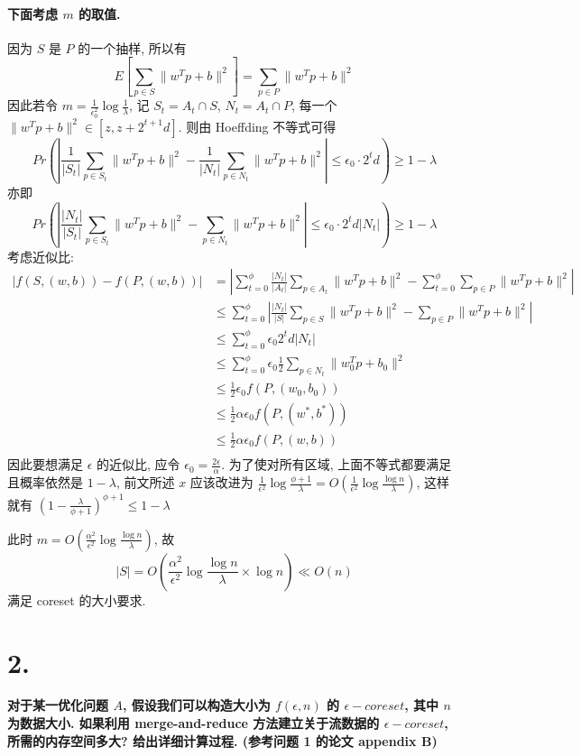 \documentclass[UTF8]{article}
\newcommand{\jumpLine} {\hspace*{\fill} \par}
\begin{document}
\paragraph{下面考虑 $m$ 的取值.} 因为 $S$ 是 $P$ 的一个抽样, 所以有 
$$E\left[\sum\limits_{p\in S} \|w^Tp + b\|^2\right] = \sum\limits_{p\in P} \|w^Tp + b\|^2$$
因此若令 $m=\frac{1}{\epsilon_0^2}\log\frac{1}{\lambda}$, 记 $S_t=A_t\cap S$, $N_t=A_t\cap P$, 每一个 $\|w^Tp + b\|^2 \in [z,z+2^{t+1}d]$. 则由 Hoeffding 不等式可得
$$Pr\left( \left| \frac{1}{|S_t|}\sum\limits_{p\in S_t} \|w^Tp + b\|^2 - \frac{1}{|N_t|}\sum\limits_{p\in N_t} \|w^Tp + b\|^2 \right| \le \epsilon_0 \cdot 2^{t}d \right) \ge 1-\lambda $$
亦即
$$Pr\left( \left| \frac{|N_t|}{|S_t|}\sum\limits_{p\in S_t} \|w^Tp + b\|^2 - \sum\limits_{p\in N_t} \|w^Tp + b\|^2 \right| \le \epsilon_0 \cdot 2^{t}d |N_t| \right) \ge 1-\lambda $$
考虑近似比:
$$\begin{aligned}
	|f(S, (w,b)) - f(P, (w,b))| &= \left| \sum\limits_{t=0}^{\phi} \frac{|N_t|}{|A_t|} \sum\limits_{p\in A_t} \|w^Tp + b\|^2 - \sum\limits_{t=0}^{\phi}\sum\limits_{p\in P} \|w^Tp + b\|^2 \right| \\
	&\le \sum\limits_{t=0}^{\phi}\left|  \frac{|N_t|}{|S|}\sum\limits_{p\in S} \|w^Tp + b\|^2 - \sum\limits_{p\in P} \|w^Tp + b\|^2 \right| \\
	&\le \sum\limits_{t=0}^{\phi}\epsilon_0 2^t d |N_t| \\
	&\le \sum\limits_{t=0}^{\phi}\epsilon_0 \frac{1}{2} \sum\limits_{p\in N_t} \|w_0^Tp + b_0\|^2 \\
	&\le \frac{1}{2}\epsilon_0 f(P, (w_0,b_0)) \\
	&\le \frac{1}{2}\alpha\epsilon_0 f(P, (w^*,b^*)) \\
	&\le \frac{1}{2}\alpha\epsilon_0 f(P, (w,b)) \\
\end{aligned}$$
因此要想满足 $\epsilon$ 的近似比, 应令 $\epsilon_0=\frac{2\epsilon}{\alpha}$. 为了使对所有区域, 上面不等式都要满足且概率依然是 $1-\lambda$, 前文所述 $x$ 应该改进为 $\frac{1}{\epsilon^2}\log\frac{\phi + 1}{\lambda} = O(\frac{1}{\epsilon^2}\log\frac{\log n}{\lambda})$, 这样就有 $(1-\frac{\lambda}{\phi + 1})^{\phi + 1} \le 1-\lambda$
\\\jumpLine\noindent
此时 $m=O(\frac{\alpha^2}{\epsilon^2}\log\frac{\log n}{\lambda})$, 故 $$|S|=O(\frac{\alpha^2}{\epsilon^2}\log\frac{\log n}{\lambda}\times \log n) \ll O(n)$$
满足 coreset 的大小要求.

\newpage
\section*{2.}
\textbf{对于某一优化问题 $A$, 假设我们可以构造大小为 $f(\epsilon, n)$ 的 $\epsilon-coreset$, 其中 $n$ 为数据大小. 如果利用 merge-and-reduce 方法建立关于流数据的 $\epsilon-coreset$, 所需的内存空间多大? 给出详细计算过程. (参考问题 1 的论文 appendix B)}
\\\jumpLine\noindent
\end{document}
